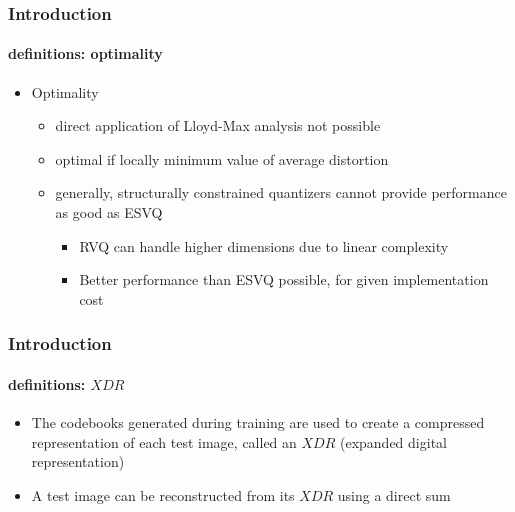 \begin{frame}
\frametitle{Introduction}
\framesubtitle{definitions: optimality}
\logoCSIPCPL\mypagenum
	\begin{itemize}
		\item {\color{red} Optimality}
			\begin{itemize}	
				\item direct application of Lloyd-Max analysis not possible
				\item optimal if locally minimum value of average distortion
				\item generally, structurally constrained quantizers cannot provide performance as good as ESVQ
					\begin{itemize}
						\item RVQ can handle higher dimensions due to linear complexity
						\item Better performance than ESVQ possible, for given implementation cost
					\end{itemize}
			\end{itemize}
	\end{itemize}
\end{frame}




\begin{frame}
\frametitle{Introduction}
\framesubtitle{definitions:  $XDR$}
\logoCSIPCPL\mypagenum
	\begin{itemize}
		\item The codebooks generated during training are used to create a compressed representation of each test image, called an $XDR$ (expanded digital representation)
		\item A test image can be reconstructed from its $XDR$ using a direct sum
	\end{itemize}
\end{frame}


